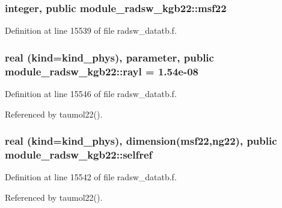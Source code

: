 \subsubsection[{\texorpdfstring{msf22}{msf22}}]{\setlength{\rightskip}{0pt plus 5cm}integer, public module\+\_\+radsw\+\_\+kgb22\+::msf22}\hypertarget{namespacemodule__radsw__kgb22_a0903a020c9e4a4f7c21911d2ab98fd46}{}\label{namespacemodule__radsw__kgb22_a0903a020c9e4a4f7c21911d2ab98fd46}


Definition at line 15539 of file radsw\+\_\+datatb.\+f.

\subsubsection[{\texorpdfstring{rayl}{rayl}}]{\setlength{\rightskip}{0pt plus 5cm}real (kind=kind\+\_\+phys), parameter, public module\+\_\+radsw\+\_\+kgb22\+::rayl = 1.\+54e-\/08}\hypertarget{namespacemodule__radsw__kgb22_ae77b766677ea476e2ba14b88e511870a}{}\label{namespacemodule__radsw__kgb22_ae77b766677ea476e2ba14b88e511870a}


Definition at line 15546 of file radsw\+\_\+datatb.\+f.



Referenced by taumol22().

\subsubsection[{\texorpdfstring{selfref}{selfref}}]{\setlength{\rightskip}{0pt plus 5cm}real (kind=kind\+\_\+phys), dimension({\bf msf22},ng22), public module\+\_\+radsw\+\_\+kgb22\+::selfref}\hypertarget{namespacemodule__radsw__kgb22_abc3bd99e8ad7d1f09fb7fab7ed67a32b}{}\label{namespacemodule__radsw__kgb22_abc3bd99e8ad7d1f09fb7fab7ed67a32b}


Definition at line 15542 of file radsw\+\_\+datatb.\+f.



Referenced by taumol22().

